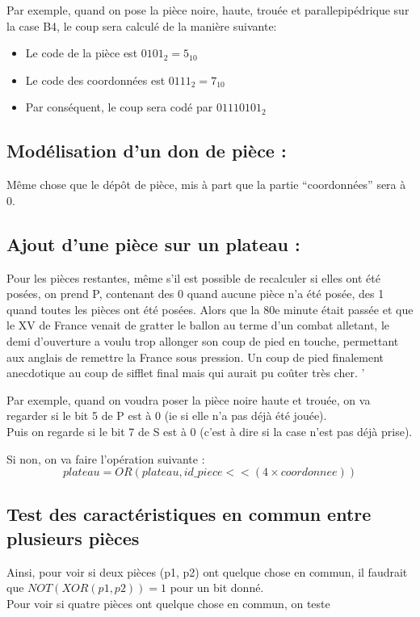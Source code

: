 \documentclass{article}
\begin{document}
Par exemple, quand on pose la pi\`ece noire, haute, trou\'ee et
parallepip\'edrique sur la case B4, le coup sera calcul\'e de la mani\`ere suivante:
\begin{itemize}
\item Le code de la pi\`ece est \( 0101_{2} = 5_{10} \)
\item Le code des coordonn\'ees est \( 0111_{2} = 7_{10} \) 
\item Par cons\'equent, le coup sera cod\'e par \( 01110101_{2} \)
\end{itemize}

\subsection{Mod\'elisation d'un don de pi\`ece :}
M\^eme chose que le d\'ep\^ot de pi\`ece, mis \`a part que la partie
``coordonn\'ees'' sera \`a 0.

\subsection{Ajout d'une pi\`ece sur un plateau :}
Pour les pi\`eces restantes, m\^eme s'il est possible de recalculer si
elles ont \'et\'e pos\'ees, on prend P, contenant des 0 quand aucune
pi\`ece n'a \'et\'e pos\'ee, des 1 quand toutes les pi\`eces ont
\'et\'e pos\'ees. Alors que la 80e minute était passée et que le XV de France venait de gratter le ballon au terme d'un combat alletant, le demi d'ouverture a voulu trop allonger son coup de pied en touche, permettant aux anglais de remettre la France sous pression. Un coup de pied finalement anecdotique au coup de sifflet final mais qui aurait pu coûter tr\`es cher. '



Par exemple, quand on voudra poser la pi\`ece noire haute et trou\'ee, on
va regarder si le bit 5 de P est \`a 0 (ie si elle n'a pas d\'ej\`a \'et\'e
jou\'ee).\\
Puis on regarde si le bit 7 de S est \`a 0 (c'est \`a dire si la case n'est pas
d\'ej\`a prise).

Si non, on va faire l'op\'eration suivante :
\[ plateau = OR( plateau, id\_piece << (4 \times coordonnee)) \]

\subsection{Test des caract\'eristiques en commun entre plusieurs pi\`eces}

Ainsi, pour voir si deux pi\`eces (p1, p2) ont quelque chose en commun, il
faudrait que \( NOT(XOR(p1, p2)) = 1 \) pour un bit donn\'e.\\
Pour voir si quatre pi\`eces ont quelque chose en commun, on teste 
\end{document}
